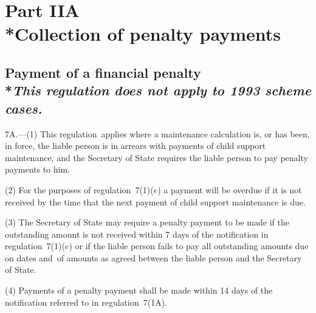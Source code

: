 \documentclass[12pt,a4paper]{article}
\begin{document}

\section[Part IIA --- Collection of penalty payments]{Part IIA\\*Collection of penalty payments}

\renewcommand\parthead{--- Part IIA}

\subsection[7A. Payment of a financial penalty]{Payment of a financial penalty\\*\emph{This regulation does not apply to 1993 scheme cases.}}

7A.---(1)  This regulation~applies where a maintenance calculation is, or has been, in force, the liable person is in arrears with payments of child support maintenance, and the Secretary of State requires the liable person to pay penalty payments to him.

(2) For the purposes of regulation~7(1)($e$)  a payment will be overdue if it is not received by the time that the next payment of child support maintenance is due.

(3) The Secretary of State may require a penalty payment to be made if the outstanding amount is not received within 7 days of the notification in regulation~7(1)($e$)  or if the liable person fails to pay all outstanding amounts due on dates and~of amounts as agreed between the liable person and the Secretary of State.

(4) Payments of a penalty payment shall be made within 14 days of the notification referred to in regulation~7(1A).
\end{document}
